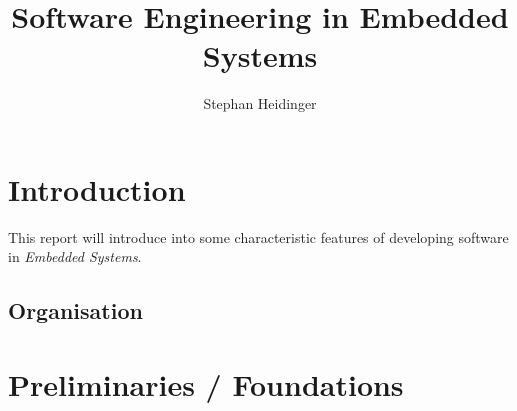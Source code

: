 \documentclass[10pt,a4paper,titlepage,draft]{article} %
\author{Stephan Heidinger}
\title{Software Engineering in Embedded Systems}
\newcommand{\red}[1]
{\textcolor{red}{#1}}
\begin{document}
\maketitle

\pagestyle{empty}
\tableofcontents
\newpage
\pagestyle{plain}
\setcounter{page}{1} %


\section{Introduction}

This report will introduce into some characteristic features of developing software in \emph{Embedded Systems}.
\marginpar{\red{do some introduction}}


\subsection{Organisation}



\section{Preliminaries / Foundations}
\end{document}
